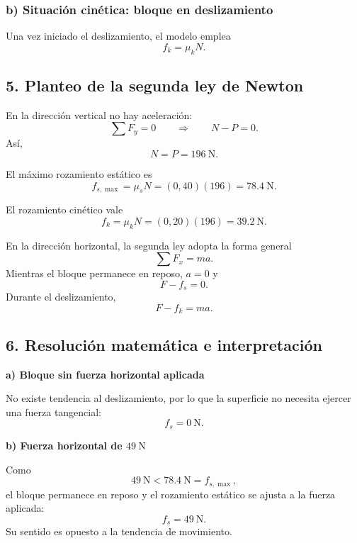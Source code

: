 \documentclass[12pt]{article}
\newcommand{\paso}[2]{%
  \subsection*{\color{AzulFisica}#1. #2}%
}
\begin{document}
\subsubsection*{b) Situación cinética: bloque en deslizamiento}
\begin{center}
\end{center}

Una vez iniciado el deslizamiento, el modelo emplea
\[
f_k=\mu_kN.
\]

\paso{5}{Planteo de la segunda ley de Newton}
En la dirección vertical no hay aceleración:
\[
\sum F_y=0
\qquad\Rightarrow\qquad
N-P=0.
\]
Así,
\[
\boxed{N=P=\SI{196}{\newton}}.
\]

El máximo rozamiento estático es
\[
f_{s,\max}=\mu_sN=(0,40)(196)=\SI{78.4}{\newton}.
\]

El rozamiento cinético vale
\[
f_k=\mu_kN=(0,20)(196)=\SI{39.2}{\newton}.
\]

En la dirección horizontal, la segunda ley adopta la forma general
\[
\sum F_x=ma.
\]
Mientras el bloque permanece en reposo, \(a=0\) y
\[
F-f_s=0.
\]
Durante el deslizamiento,
\[
F-f_k=ma.
\]

\paso{6}{Resolución matemática e interpretación}

\textbf{a) Bloque sin fuerza horizontal aplicada}

No existe tendencia al deslizamiento, por lo que la superficie no necesita ejercer una fuerza tangencial:
\[
\boxed{f_s=\SI{0}{\newton}}.
\]

\textbf{b) Fuerza horizontal de \(\SI{49}{\newton}\)}

Como
\[
\SI{49}{\newton}<\SI{78.4}{\newton}=f_{s,\max},
\]
el bloque permanece en reposo y el rozamiento estático se ajusta a la fuerza aplicada:
\[
\boxed{f_s=\SI{49}{\newton}}.
\]
Su sentido es opuesto a la tendencia de movimiento.
\end{document}

